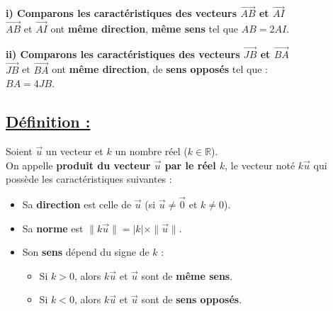 \documentclass{article}
\begin{document}
\begin{center}
\end{center}

\vspace{1em}

\noindent \textbf{i) Comparons les caractéristiques des vecteurs $\overrightarrow{AB}$ et $\overrightarrow{AI}$} \\
$\overrightarrow{AB}$ et $\overrightarrow{AI}$ ont \textbf{même direction}, \textbf{même sens} tel que $AB = 2AI$.

\vspace{0.5em}

\noindent \textbf{ii) Comparons les caractéristiques des vecteurs $\overrightarrow{JB}$ et $\overrightarrow{BA}$} \\
$\overrightarrow{JB}$ et $\overrightarrow{BA}$ ont \textbf{même direction}, de \textbf{sens opposés} tel que : \\
$BA = 4JB$.

\subsection*{\underline{\color{red}Définition :}}

\noindent Soient $\vec{u}$ un vecteur et $k$ un nombre réel ($k \in \mathbb{R}$). \\
On appelle \textbf{produit du vecteur $\vec{u}$ par le réel $k$}, le vecteur noté $k\vec{u}$ qui possède les caractéristiques suivantes :

\begin{itemize}
    \item Sa \textbf{direction} est celle de $\vec{u}$ (si $\vec{u} \neq \vec{0}$ et $k \neq 0$).
    \item Sa \textbf{norme} est $\|k\vec{u}\| = |k| \times \|\vec{u}\|$.
    \item Son \textbf{sens} dépend du signe de $k$ :
    \begin{itemize}
        \item[\textcolor{red}{$\bullet$}] Si $k > 0$, alors $k\vec{u}$ et $\vec{u}$ sont de \textbf{même sens}.
        \item[\textcolor{red}{$\bullet$}] Si $k < 0$, alors $k\vec{u}$ et $\vec{u}$ sont de \textbf{sens opposés}.
    \end{itemize}
\end{itemize}
\end{document}
